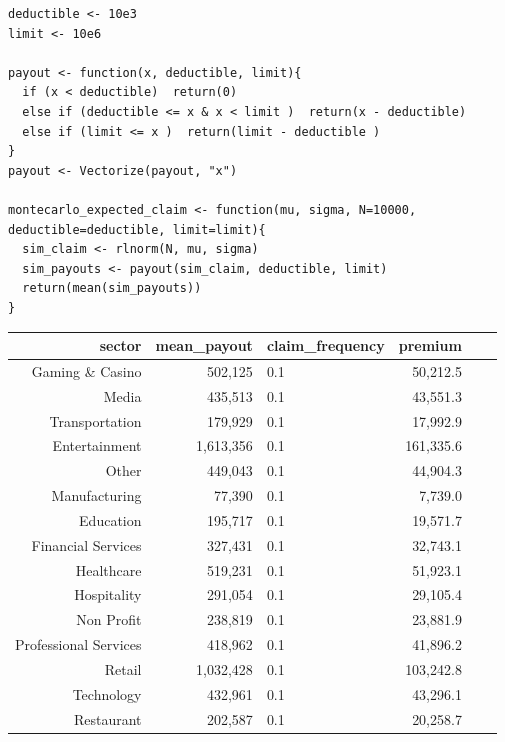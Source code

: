 \documentclass[usenames,dvipsnames]{beamer}
\begin{document}
\begin{frame}[fragile]

\tiny

\begin{verbatim}
deductible <- 10e3
limit <- 10e6

payout <- function(x, deductible, limit){
  if (x < deductible)  return(0)
  else if (deductible <= x & x < limit )  return(x - deductible)
  else if (limit <= x )  return(limit - deductible )
}
payout <- Vectorize(payout, "x")

montecarlo_expected_claim <- function(mu, sigma, N=10000, deductible=deductible, limit=limit){
  sim_claim <- rlnorm(N, mu, sigma)  
  sim_payouts <- payout(sim_claim, deductible, limit)
  return(mean(sim_payouts))
}
\end{verbatim}



\begin{tabular}{|r|r|l|r|r|r|}
\hline
 sector & mean\_payout & claim\_frequency & premium\\
\hline
\hline
 Gaming \& Casino & 502,125 & 0.1 & 50,212.5\\ \hline
 Media & 435,513 & 0.1 & 43,551.3\\ \hline
 Transportation & 179,929 & 0.1 & 17,992.9\\ \hline
 Entertainment & 1,613,356 & 0.1 & 161,335.6\\ \hline
 Other & 449,043 & 0.1 & 44,904.3\\ \hline
 Manufacturing & 77,390 & 0.1 & 7,739.0\\ \hline
 Education & 195,717 & 0.1 & 19,571.7\\ \hline
 Financial Services & 327,431 & 0.1 & 32,743.1\\ \hline
 Healthcare & 519,231 & 0.1 & 51,923.1\\ \hline
 Hospitality & 291,054 & 0.1 & 29,105.4\\ \hline
 Non Profit & 238,819 & 0.1 & 23,881.9\\ \hline
 Professional Services & 418,962 & 0.1 & 41,896.2\\ \hline
 Retail & 1,032,428 & 0.1 & 103,242.8\\ \hline
 Technology & 432,961 & 0.1 & 43,296.1\\ \hline
 Restaurant & 202,587 & 0.1 & 20,258.7\\ \hline
\end{tabular}

 
\end{frame}
\end{document}
